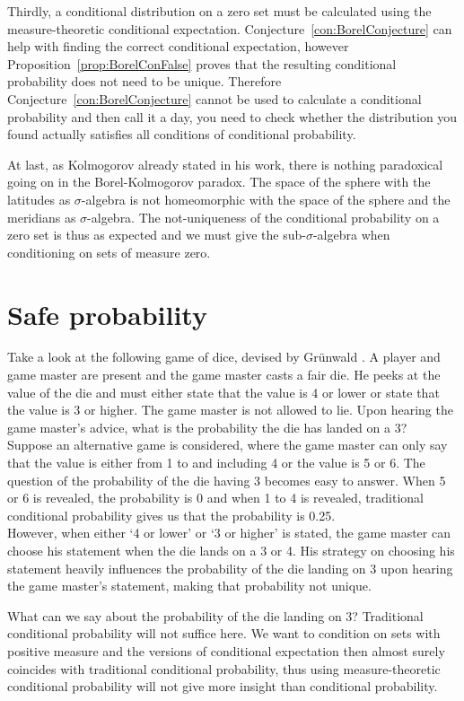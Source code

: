 \documentclass[a4paper]{report}
\theoremstyle{plain}
\theoremstyle{definition}
\theoremstyle{remark}
\numberwithin{equation}{chapter}
\DeclareMathOperator{\1}{\mathbbm{1}}
\begin{document}
Thirdly, a conditional distribution on a zero set must be calculated using the measure-theoretic conditional expectation. Conjecture~\ref{con:BorelConjecture} can help with finding the correct conditional expectation, however Proposition~\ref{prop:BorelConFalse} proves that the resulting conditional probability does not need to be unique. Therefore Conjecture~\ref{con:BorelConjecture} cannot be used to calculate a conditional probability and then call it a day, you need to check whether the distribution you found actually satisfies all conditions of conditional probability.

At last, as Kolmogorov \cite{Kolmogorov33} already stated in his work, there is nothing paradoxical going on in the Borel-Kolmogorov paradox. The space of the sphere with the latitudes as $\sigma$-algebra is not homeomorphic with the space of the sphere and the meridians as $\sigma$-algebra. The not-uniqueness of the conditional probability on a zero set is thus as expected and we must give the sub-$\sigma$-algebra when conditioning on sets of measure zero.


\chapter{Safe probability}\label{chap:SafeProp}
Take a look at the following game of dice, devised by Grünwald \cite{Grunwald13}. A player and game master are present and the game master casts a fair die. He peeks at the value of the die and must either state that the value is 4 or lower or state that the value is 3 or higher. The game master is not allowed to lie. Upon hearing the game master's advice, what is the probability the die has landed on a 3?\\
Suppose an alternative game is considered, where the game master can only say that the value is either from 1 to and including 4 or the value is 5 or 6. The question of the probability of the die having 3 becomes easy to answer. When 5 or 6 is revealed, the probability is 0 and when 1 to 4 is revealed, traditional conditional probability gives us that the probability is 0.25.\\
However, when either `4 or lower' or `3 or higher' is stated, the game master can choose his statement when the die lands on a 3 or 4. His strategy on choosing his statement heavily influences the probability of the die landing on 3 upon hearing the game master's statement, making that probability not unique.

What can we say about the probability of the die landing on 3? Traditional conditional probability will not suffice here. We want to condition on sets with positive measure and the versions of conditional expectation then almost surely coincides with traditional conditional probability, thus using measure-theoretic conditional probability will not give more insight than conditional probability.
\end{document}
